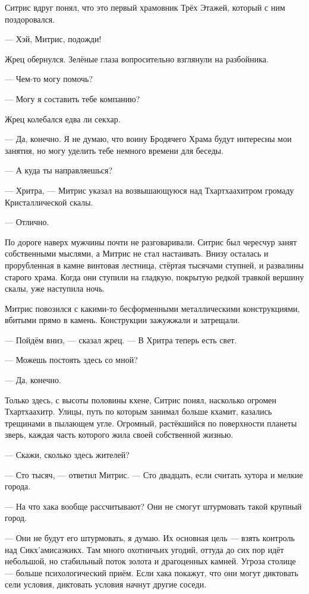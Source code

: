 Ситрис вдруг понял, что это первый храмовник Трёх Этажей, который с ним поздоровался.

--- Хэй, Митрис, подожди!

Жрец обернулся.
Зелёные глаза вопросительно взглянули на разбойника.

--- Чем-то могу помочь?

--- Могу я составить тебе компанию?

Жрец колебался едва ли секхар.

--- Да, конечно.
Я не думаю, что воину Бродячего Храма будут интересны мои занятия, но могу уделить тебе немного времени для беседы.

--- А куда ты направляешься?

--- Хритра, --- Митрис указал на возвышающуюся над Тхартхаахитром громаду Кристаллической скалы.

--- Отлично.

По дороге наверх мужчины почти не разговаривали.
Ситрис был чересчур занят собственными мыслями, а Митрис не стал настаивать.
Внизу осталась и прорубленная в камне винтовая лестница, стёртая тысячами ступней, и развалины старого храма.
Когда они ступили на гладкую, покрытую редкой травкой вершину скалы, уже наступила ночь.

Митрис повозился с какими-то бесформенными металлическими конструкциями, вбитыми прямо в камень.
Конструкции зажужжали и затрещали.

--- Пойдём вниз, --- сказал жрец.
--- В Хритра теперь есть свет.

--- Можешь постоять здесь со мной?

--- Да, конечно.

Только здесь, с высоты половины кхене, Ситрис понял, насколько огромен Тхартхаахитр.
Улицы, путь по которым занимал больше кхамит, казались трещинами в пылающем угле.
Огромный, растёкшийся по поверхности планеты зверь, каждая часть которого жила своей собственной жизнью.

--- Скажи, сколько здесь жителей?

--- Сто тысяч, --- ответил Митрис.
--- Сто двадцать, если считать хутора и мелкие города.

--- На что хака вообще рассчитывают?
Они не смогут штурмовать такой крупный город.

--- Они не будут его штурмовать, я думаю.
Их основная цель --- взять контроль над Сикх'амисаэкикх.
Там много охотничьих угодий, оттуда до сих пор идёт небольшой, но стабильный поток золота и драгоценных камней.
Угроза столице --- больше психологический приём.
Если хака покажут, что они могут диктовать сели условия, диктовать условия начнут другие соседи.

